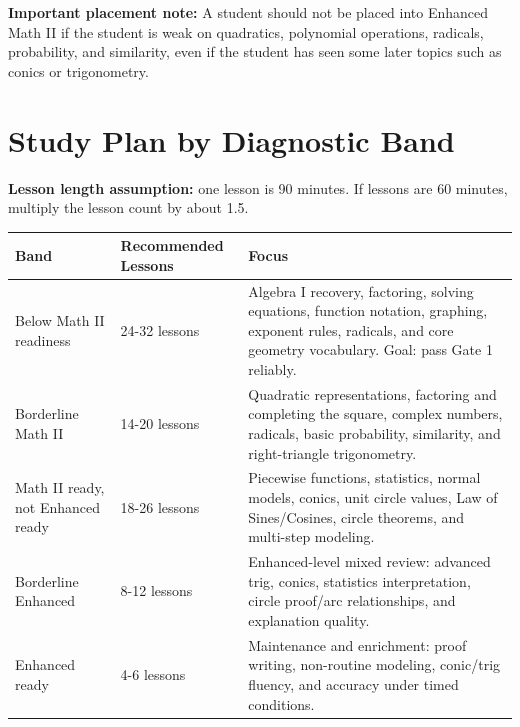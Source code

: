 \documentclass[11pt]{article}
\renewcommand{\arraystretch}{1.18}
\begin{document}
\begin{titlebox}
\textbf{Important placement note:} A student should not be placed into Enhanced Math II if the student is weak on quadratics, polynomial operations, radicals, probability, and similarity, even if the student has seen some later topics such as conics or trigonometry.
\end{titlebox}

\newpage
\section*{Study Plan by Diagnostic Band}
\begin{sectionNote}
\textbf{Lesson length assumption:} one lesson is 90 minutes. If lessons are 60 minutes, multiply the lesson count by about 1.5.
\end{sectionNote}

\begin{center}
\renewcommand{\arraystretch}{1.25}
\begin{tabular}{|L{3.0cm}|L{3.8cm}|L{6.6cm}|}
\hline
\textbf{Band} & \textbf{Recommended Lessons} & \textbf{Focus}\\
\hline
Below Math II readiness & 24-32 lessons & Algebra I recovery, factoring, solving equations, function notation, graphing, exponent rules, radicals, and core geometry vocabulary. Goal: pass Gate 1 reliably.\\
\hline
Borderline Math II & 14-20 lessons & Quadratic representations, factoring and completing the square, complex numbers, radicals, basic probability, similarity, and right-triangle trigonometry.\\
\hline
Math II ready, not Enhanced ready & 18-26 lessons & Piecewise functions, statistics, normal models, conics, unit circle values, Law of Sines/Cosines, circle theorems, and multi-step modeling.\\
\hline
Borderline Enhanced & 8-12 lessons & Enhanced-level mixed review: advanced trig, conics, statistics interpretation, circle proof/arc relationships, and explanation quality.\\
\hline
Enhanced ready & 4-6 lessons & Maintenance and enrichment: proof writing, non-routine modeling, conic/trig fluency, and accuracy under timed conditions.\\
\hline
\end{tabular}
\end{center}
\end{document}
